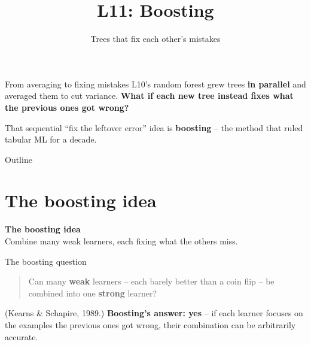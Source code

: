 \documentclass[aspectratio=169]{beamer}
\title{L11: Boosting}
\subtitle{Trees that fix each other's mistakes}
\date{}
\newcommand{\sectiontransition}[2]{%
  \begin{frame}[plain]
    \vfill
    \begin{center}
      {\Large\color{popblue}\textbf{#1}}\\[10pt]
      {\normalsize #2}
    \end{center}
    \vfill
  \end{frame}}
\begin{document}
\begin{frame}{From averaging to fixing mistakes}
  L10's random forest grew trees \textbf{in parallel} and averaged them to cut variance.
  \textbf{What if each new tree instead fixes what the previous ones got wrong?}
  \vfill
  \begin{center}
  \end{center}
  \vfill
  \footnotesize That sequential ``fix the leftover error'' idea is \textbf{boosting} -- the
  method that ruled tabular ML for a decade.
\end{frame}

\begin{frame}{Outline}
  \tableofcontents
\end{frame}

\section{The boosting idea}
\sectiontransition{The boosting idea}{Combine many weak learners, each fixing what the others miss.}

\begin{frame}{The boosting question}
  \begin{quote}
    Can many \textbf{weak} learners -- each barely better than a coin flip -- be combined
    into one \textbf{strong} learner?
  \end{quote}
  \hfill {\footnotesize (Kearns \& Schapire, 1989.)}
  \vfill
  \textbf{Boosting's answer: yes} -- if each learner focuses on the examples the previous
  ones got wrong, their combination can be arbitrarily accurate.
  \vfill
\end{frame}
\end{document}
